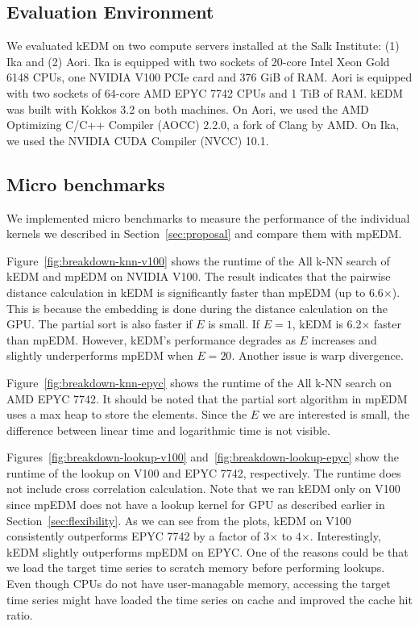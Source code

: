 \documentclass[sigconf]{acmart}
\begin{document}
\subsection{Evaluation Environment}


We evaluated kEDM on two compute servers installed at the Salk Institute: (1)
Ika and (2) Aori. Ika is equipped with two sockets of 20-core Intel Xeon Gold
6148 CPUs, one NVIDIA V100 PCIe card and 376 GiB of RAM\@. Aori is equipped with
two sockets of 64-core AMD EPYC 7742 CPUs and 1 TiB of RAM\@. kEDM was built
with Kokkos 3.2 on both machines. On Aori, we used the AMD Optimizing C/C++
Compiler (AOCC) 2.2.0, a fork of Clang by AMD. On Ika, we used the NVIDIA CUDA
Compiler (NVCC) 10.1.

\subsection{Micro benchmarks}

We implemented micro benchmarks to measure the performance of the individual
kernels we described in Section~\ref{sec:proposal} and compare them with
mpEDM\@.

Figure~\ref{fig:breakdown-knn-v100} shows the runtime of the All k-NN search
of kEDM and mpEDM on NVIDIA V100. The result indicates that the pairwise
distance calculation in kEDM is significantly faster than mpEDM (up to
6.6$\times$). This is because the embedding is done during the distance
calculation on the GPU\@. The partial sort is also faster if $E$ is small. If
$E=1$, kEDM is 6.2$\times$ faster than mpEDM\@. However, kEDM's performance
degrades as $E$ increases and slightly underperforms mpEDM when $E=20$.
Another issue is warp divergence.

Figure~\ref{fig:breakdown-knn-epyc} shows the runtime of the All k-NN search
on AMD EPYC 7742. It should be noted that the partial sort algorithm in mpEDM
uses a max heap to store the elements. Since the $E$ we are interested is
small, the difference between linear time and logarithmic time is not visible.


Figures~\ref{fig:breakdown-lookup-v100} and~\ref{fig:breakdown-lookup-epyc}
show the runtime of the lookup on V100 and EPYC 7742, respectively. The runtime
does not include cross correlation calculation. Note that we ran kEDM only on
V100 since mpEDM does not have a lookup kernel for GPU as described earlier in
Section~\ref{sec:flexibility}. As we can see from the plots, kEDM on V100
consistently outperforms EPYC 7742 by a factor of 3$\times$ to 4$\times$.
Interestingly, kEDM slightly outperforms mpEDM on EPYC. One of the reasons could
be that we load the target time series to scratch memory before performing
lookups. Even though CPUs do not have user-managable memory, accessing the
target time series might have loaded the time series on cache and improved the
cache hit ratio.
\end{document}
